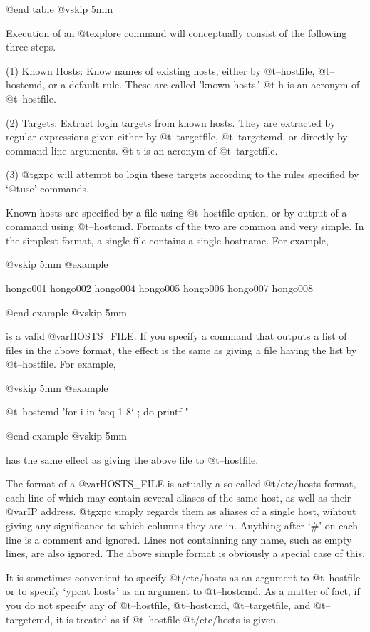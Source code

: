 @end table
@vskip 5mm

Execution of an @t{explore} command will conceptually consist of the
following three steps.

(1) Known Hosts: Know names of existing hosts, either by
@t{--hostfile}, @t{--hostcmd}, or a default rule. These are called
'known hosts.' @t{-h} is an acronym of @t{--hostfile}.

(2) Targets: Extract login targets from known hosts. They are
extracted by regular expressions given either by @t{--targetfile},
@t{--targetcmd}, or directly by command line arguments. @t{-t} is
an acronym of @t{--targetfile}.

(3) @t{gxpc} will attempt to login these targets according to the
rules specified by `@t{use}' commands.

Known hosts are specified by a file using @t{--hostfile} option, or
by output of a command using @t{--hostcmd}. Formats of the two are
common and very simple. In the simplest format, a single file
contains a single hostname. For example,

@vskip 5mm
@example

   hongo001
   hongo002
   hongo004
   hongo005
   hongo006
   hongo007
   hongo008

@end example
@vskip 5mm

is a valid @var{HOSTS_FILE}. If you specify a command that outputs
a list of files in the above format, the effect is the same
as giving a file having the list by @t{--hostfile}. For example,

@vskip 5mm
@example

  @t{--hostcmd} 'for i in `seq 1 8` ; do printf "%

@end example
@vskip 5mm

has the same effect as giving the above file to @t{--hostfile}.

The format of a @var{HOSTS_FILE} is actually a so-called @t{/etc/hosts}
format, each line of which may contain several aliases of the
same host, as well as their @var{IP} address. @t{gxpc} simply regards them
as aliases of a single host, wihtout giving any significance to
which columns they are in. Anything after `#' on each line is a
comment and ignored. Lines not containning any name, such as
empty lines, are also ignored.  The above simple format is
obviously a special case of this.

It is sometimes convenient to specify @t{/etc/hosts} as an argument
to @t{--hostfile} or to specify `ypcat hosts' as an argument to
@t{--hostcmd}. As a matter of fact, if you do not specify any of
@t{--hostfile}, @t{--hostcmd}, @t{--targetfile}, and @t{--targetcmd}, it is
treated as if @t{--hostfile} @t{/etc/hosts} is given.

